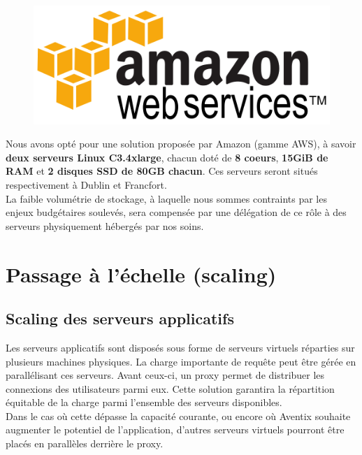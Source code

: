 \begin{figure}[H]
    \centering
    \includegraphics[width=\textwidth]{aws}
\end{figure}

Nous avons opté pour une solution proposée par Amazon (gamme AWS), à savoir
\textbf{deux serveurs Linux C3.4xlarge}, chacun doté de \textbf{8 coeurs},
\textbf{15GiB de RAM} et \textbf{2 disques SSD de 80GB chacun}. Ces serveurs
seront situés respectivement à Dublin et Francfort. \\

La faible volumétrie de stockage, à laquelle nous sommes contraints par les
enjeux budgétaires soulevés, sera compensée par une délégation de ce rôle à
des serveurs physiquement hébergés par nos soins.

\section{Passage à l'échelle (scaling)}
\label{sec:scaling}

\subsection{Scaling des serveurs applicatifs}
\label{subsec:scaling-applicatif}

Les serveurs applicatifs sont disposés sous forme de serveurs virtuels
réparties sur plusieurs machines physiques. La charge importante de requête
peut être gérée en parallélisant ces serveurs. Avant ceux-ci, un proxy permet
de distribuer les connexions des utilisateurs parmi eux. Cette solution
garantira la répartition équitable de la charge parmi l'ensemble des serveurs
disponibles. \\

Dans le cas où cette dépasse la capacité courante, ou encore où Aventix souhaite
augmenter le potentiel de l'application, d'autres serveurs virtuels pourront
être placés en parallèles derrière le proxy. \\

